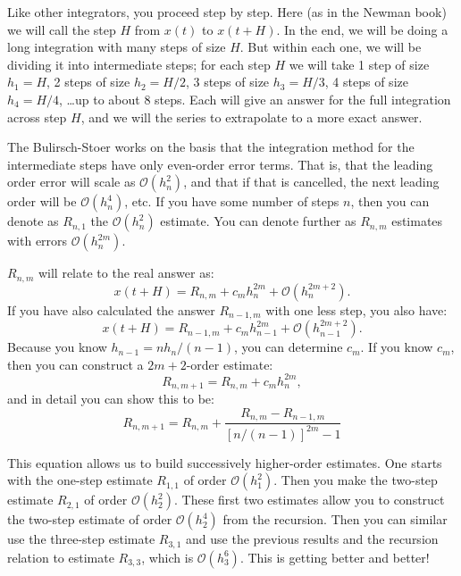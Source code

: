 Like other integrators, you proceed step by step. Here (as in the
Newman book) we will call the step $H$ from $x(t)$ to $x(t+H)$. In the
end, we will be doing a long integration with many steps of size
$H$. But within each one, we will be dividing it into intermediate
steps; for each step $H$ we will take 1 step of size $h_1 =H$, 2 steps
of size $h_2 = H / 2$, 3 steps of size $h_3 = H/3$, 4 steps of size
$h_4 = H / 4$, \ldots up to about 8 steps.  Each will give an answer
for the full integration across step $H$, and we will the series to
extrapolate to a more exact answer.

The Bulirsch-Stoer works on the basis that the integration method for
the intermediate steps have only even-order error terms. That is, that
the leading order error will scale as $\mathcal{O}(h_n^{2})$, and that
if that is cancelled, the next leading order will be
$\mathcal{O}(h_n^4)$, etc. If you have some number of steps $n$, then
you can denote as $R_{n,1}$ the $\mathcal{O}(h_n^{2})$ estimate.  You
can denote further as $R_{n,m}$ estimates with errors
$\mathcal{O}(h_n^{2m})$. 

$R_{n,m}$ will relate to the real answer as:
\begin{equation}
x(t+H) = R_{n,m} + c_m h_n^{2m} + \mathcal{O}(h_n^{2m+2}).
\end{equation}
If you have also calculated the answer $R_{n-1,m}$ with one less step,
you also have:
\begin{equation}
x(t+H) = R_{n-1,m} + c_m h_{n-1}^{2m} + \mathcal{O}(h_{n-1}^{2m+2}).
\end{equation}
Because you know $h_{n-1} = n h_n / (n-1)$, you can determine $c_m$.
If you know $c_m$, then you can construct a $2m+2$-order estimate:
\begin{equation}
  R_{n,m+1} = R_{n,m} +c_mh_n^{2m},
\end{equation}
and in detail you can show this to be:
\begin{equation}
  R_{n,m+1} = R_{n,m} + \frac{R_{n,m} - R_{n-1,
      m}}{\left[n/(n-1)\right]^{2m} -1}
\end{equation}

This equation allows us to build successively higher-order
estimates. One starts with the one-step estimate $R_{1,1}$ of order
$\mathcal{O}(h_1^2)$. Then you make the two-step estimate $R_{2,1}$ of
order $\mathcal{O}(h_2^2)$. These first two estimates allow you to
construct the two-step estimate of order $\mathcal{O}(h_2^4)$ from the
recursion. Then you can similar use the three-step estimate $R_{3,1}$
and use the previous results and the recursion relation to estimate
$R_{3,3}$, which is $\mathcal{O}(h_3^6)$. This is getting better and
better!

